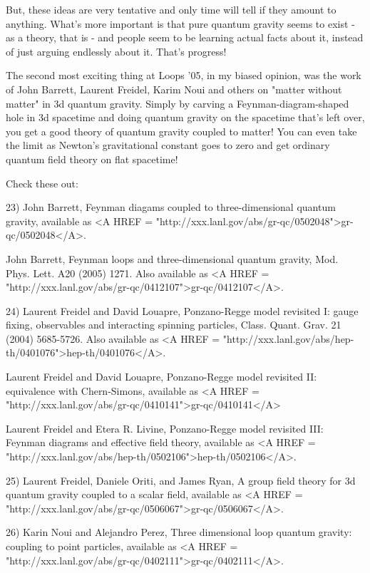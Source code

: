But, these ideas are very tentative and only time will tell if they amount to
anything.  What's more important is that pure quantum gravity seems
to exist - as a theory, that is - and people seem to be learning
actual facts about it, instead of just arguing endlessly about it.
That's progress!

The second most exciting thing at Loops '05, in my biased opinion,
was the work of John Barrett, Laurent Freidel, Karim Noui and others 
on "matter without matter" in 3d quantum gravity.  Simply by carving a 
Feynman-diagram-shaped hole in 3d spacetime and doing quantum gravity
on the spacetime that's left over, you get a good theory of quantum
gravity coupled to matter!  You can even take the limit as Newton's
gravitational constant goes to zero and get ordinary quantum field
theory on flat spacetime!  

Check these out:

23) John Barrett, Feynman diagams coupled to three-dimensional quantum 
gravity, available as <A HREF = "http://xxx.lanl.gov/abs/gr-qc/0502048">gr-qc/0502048</A>.

John Barrett, Feynman loops and three-dimensional quantum gravity,
Mod. Phys. Lett. A20 (2005) 1271.  Also available as <A HREF = "http://xxx.lanl.gov/abs/gr-qc/0412107">gr-qc/0412107</A>.

24) Laurent Freidel and David Louapre, Ponzano-Regge model revisited
I: gauge fixing, observables and interacting spinning particles, 
Class. Quant. Grav. 21 (2004) 5685-5726.  Also available as 
<A HREF = "http://xxx.lanl.gov/abs/hep-th/0401076">hep-th/0401076</A>.

Laurent Freidel and David Louapre, Ponzano-Regge model revisited 
II: equivalence with Chern-Simons, available as <A HREF = "http://xxx.lanl.gov/abs/gr-qc/0410141">gr-qc/0410141</A>

Laurent Freidel and Etera R. Livine, Ponzano-Regge model 
revisited III: Feynman diagrams and effective field theory,
available as <A HREF = "http://xxx.lanl.gov/abs/hep-th/0502106">hep-th/0502106</A>.

25) Laurent Freidel, Daniele Oriti, and James Ryan, A group field 
theory for 3d quantum gravity coupled to a scalar field, available
as <A HREF = "http://xxx.lanl.gov/abs/gr-qc/0506067">gr-qc/0506067</A>.

26) Karin Noui and Alejandro Perez, Three dimensional loop quantum 
gravity: coupling to point particles, available as <A HREF = "http://xxx.lanl.gov/abs/gr-qc/0402111">gr-qc/0402111</A>.

